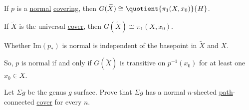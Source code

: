 \begin{corollary}
	If \(p\) is a \hyperref[def:normal]{normal} \hyperref[def:covering-map]{covering}, then \(G(\widetilde{X} ) \cong \quotient{\pi _1(X, x_0)}{H} \).
\end{corollary}
\begin{corollary}
	If \(\widetilde{X} \) is the universal \hyperref[def:covering-map]{cover}, then \(G(\widetilde{X} )\cong \pi _1(X, x_0)\).
\end{corollary}

\begin{exercise}
	Whether \(\mathrm{Im}(p_\ast)\) is normal is independent of the basepoint in \(\widetilde{X} \) and \(X\).
\end{exercise}

So, \(p\) is normal if and only if \(G(\widetilde{X} )\) is transitive on \(p^{-1} (x_0)\) for at least one
\(x_0\in X\).
\begin{exercise}
	Let \(\Sigma g\) be the genus \(g\) surface. Prove that \(\Sigma g\) has a normal \(n\)-sheeted \hyperref[def:path]{path}-connected
	\hyperref[def:covering-map]{cover} for every \(n\).
\end{exercise}